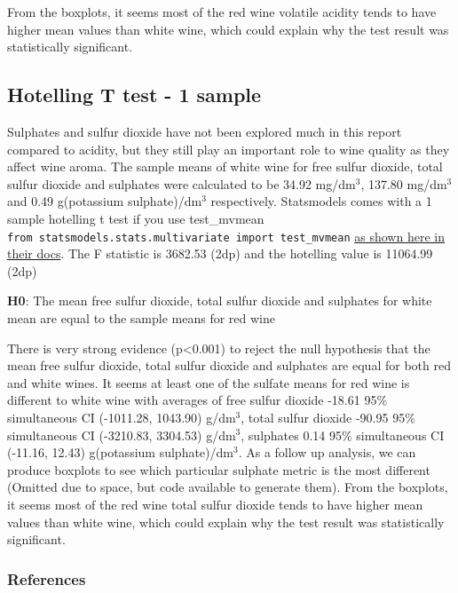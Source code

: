 \documentclass[
]{article}
\begin{document}
From the boxplots, it seems most of the red wine volatile acidity tends
to have higher mean values than white wine, which could explain why the
test result was statistically significant.

\subsection{Hotelling T test - 1
sample}\label{hotelling-t-test---1-sample}

Sulphates and sulfur dioxide have not been explored much in this report
compared to acidity, but they still play an important role to wine
quality as they affect wine aroma. The sample means of white wine for
free sulfur dioxide, total sulfur dioxide and sulphates were calculated
to be 34.92 mg/dm\(^3\), 137.80 mg/dm\(^3\) and 0.49 g(potassium
sulphate)/dm\(^3\) respectively. Statsmodels comes with a 1 sample
hotelling t test if you use test\_mvmean
\texttt{from\ statsmodels.stats.multivariate\ import\ test\_mvmean}
\href{https://www.statsmodels.org/dev/generated/statsmodels.stats.multivariate.test_mvmean.html}{as
shown here in their docs}. The F statistic is 3682.53 (2dp) and the
hotelling value is 11064.99 (2dp)

\textbf{H0}: The mean free sulfur dioxide, total sulfur dioxide and
sulphates for white mean are equal to the sample means for red wine

There is very strong evidence (p\textless0.001) to reject the null
hypothesis that the mean free sulfur dioxide, total sulfur dioxide and
sulphates are equal for both red and white wines. It seems at least one
of the sulfate means for red wine is different to white wine with
averages of free sulfur dioxide -18.61 95\% simultaneous CI (-1011.28,
1043.90) g/dm\(^3\), total sulfur dioxide -90.95 95\% simultaneous CI
(-3210.83, 3304.53) g/dm\(^3\), sulphates 0.14 95\% simultaneous CI
(-11.16, 12.43) g(potassium sulphate)/dm\(^3\). As a follow up analysis,
we can produce boxplots to see which particular sulphate metric is the
most different (Omitted due to space, but code available to generate
them). From the boxplots, it seems most of the red wine total sulfur
dioxide tends to have higher mean values than white wine, which could
explain why the test result was statistically significant.

\subsubsection{References}\label{references}
\end{document}
